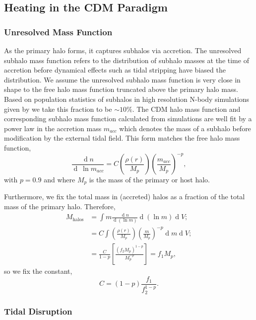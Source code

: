 \documentclass[usenatbib]{mnras}
\renewcommand{\d}[1]{\! \mathrm{d}#1 \:}
\newcommand{\deriv}[2]{\frac{\d{#1}}{\d{#2}}}
\renewcommand{\d}[1]{\ensuremath{\operatorname{d}\!{#1}}}
\begin{document}
\subsection{Heating in the CDM Paradigm}

\subsubsection{Unresolved Mass Function}

As the primary halo forms, it captures subhalos via accretion. The unresolved subhalo mass function refers to the distribution of subhalo masses at the time of accretion before dynamical effects such as tidal stripping have biased the distribution. We assume the unresolved subhalo mass function is very close in shape to the free halo mass function truncated above the primary halo mass. Based on population statistics of subhalos in high resolution N-body simulations given by \citet{subhalo_abundance} we take this fraction to be $\sim 10\%$. The CDM halo mass function and corresponding subhalo mass function calculated from simulations \citep{pop_of_subhalos, unified_model} are well fit by a power law in the accretion mass $m_{acc}$ which denotes the mass of a subhalo before modification by the external tidal field. This form matches the free halo mass function, 
\begin{equation}
\frac{\d{n}}{\d{\: \ln{m_{acc}}}} = C \left(\frac{\rho(r)}{M_p}\right) \left(\frac{m_{acc}}{M_p} \right)^{-p} ,
\end{equation}
with $p = 0.9$ and where $M_p$ is the mass of the primary or host halo.
\par
Furthermore, we fix the total mass in (accreted) halos as a fraction of the total mass of the primary halo. Therefore,
\begin{subequations}
\begin{align}
M_{\mathrm{halos}} & = \int m \deriv{n}{(\ln{m})} \d{(\ln{m})} \d{V} ;
\\
& = C \int \left(\frac{\rho(r)}{M_p}\right) \left(\frac{m}{M_p} \right)^{-p} \d{m} \d{V} ;
\\
& = \frac{C}{1-p} \left[ \frac{(f_2 M_p)^{1-p}}{M_p^{-p}} \right] = f_1 M_p ,
\end{align} 
\end{subequations}
so we fix the constant,
\begin{equation}
C = (1 - p)\frac{f_1}{f_2^{1-p}} .
\end{equation}

\subsubsection{Tidal Disruption} 
\end{document}
